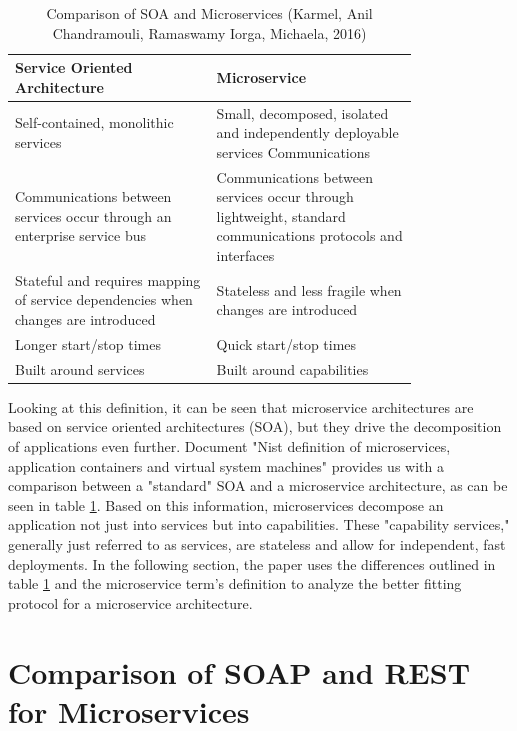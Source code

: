 \documentclass[conference]{IEEEtran}
\begin{document}
\begin{table}[!htbp]
	\centering
	\caption{Comparison of SOA and Microservices (Karmel, Anil
		Chandramouli, Ramaswamy
		Iorga, Michaela, 2016)}
	\label{micro:comparison}
	\begin{tabular}{| p{0.4\linewidth} | p{0.4\linewidth}|}\hline
		Service Oriented Architecture & Microservice \\\hline
	Self-contained, monolithic services & Small, decomposed, isolated and independently deployable services Communications\\\hline
		Communications between services occur through an enterprise service bus & Communications between services occur through lightweight, standard communications protocols and interfaces\\\hline
		Stateful and requires mapping of service dependencies when changes are introduced & Stateless and less fragile when changes are introduced\\\hline
		Longer start/stop times & Quick start/stop times\\\hline
		Built around services & Built around capabilities\\\hline
	\end{tabular}
\end{table}

Looking at this definition, it can be seen that microservice architectures are based on service oriented architectures (SOA), but they drive the decomposition of applications even further. Document "Nist definition of microservices, application containers and virtual system machines" \cite{karmel2016nist} provides us with a comparison between a "standard" SOA and a microservice architecture, as can be seen in table \ref{micro:comparison}. Based on this information, microservices decompose an application not just into services but into capabilities. These "capability services," generally just referred to as services, are stateless and allow for independent, fast deployments. In the following section, the paper uses the differences outlined in table \ref{micro:comparison} and the microservice term's definition to analyze the better fitting protocol for a microservice architecture.

\section{Comparison of SOAP and REST for Microservices}
\label{sec:comp}
\end{document}

